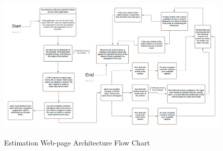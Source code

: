 \documentclass[12pt]{article}
\begin{document}
\begin{figure}[H]
\caption{Estimation Web-page Architecture Flow Chart}
\centering
\includegraphics[scale=.22]{figures/Application Architecture.png}\\
\end{figure}
\end{document}
